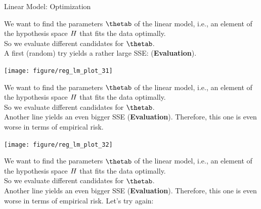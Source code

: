 \documentclass[11pt,compress,t,notes=noshow, xcolor=table]{beamer}
\newenvironment{knitrout}{}{} %
\begin{document}
\begin{vbframe}{Linear Model: Optimization}

We want to find the parameters $\thetab$ of the linear model, i.e., an element of the hypothesis space $H$ that fits the data optimally.\\

So we evaluate different candidates for $\thetab$.\\

A first (random) try yields a rather large SSE: (\textbf{Evaluation}).
\lz

\begin{knitrout}\scriptsize
{}\color{fgcolor}

{\centering \texttt{[image: figure/reg\_lm\_plot\_31]} 

}



\end{knitrout}

\framebreak

We want to find the parameters $\thetab$ of the linear model, i.e., an element of the hypothesis space $H$ that fits the data optimally.\\

So we evaluate different candidates for $\thetab$.\\

Another line yields an even bigger SSE (\textbf{Evaluation}). Therefore, this one is even worse in
terms of empirical risk.

\begin{knitrout}\scriptsize
{}\color{fgcolor}

{\centering \texttt{[image: figure/reg\_lm\_plot\_32]} 

}



\end{knitrout}

\framebreak

We want to find the parameters $\thetab$ of the linear model, i.e., an element of the hypothesis space $H$ that fits the data optimally.\\

So we evaluate different candidates for $\thetab$.\\

Another line yields an even bigger SSE (\textbf{Evaluation}). Therefore, this one is even worse in
terms of empirical risk. Let's try again:


\end{vbframe}
\end{document}
